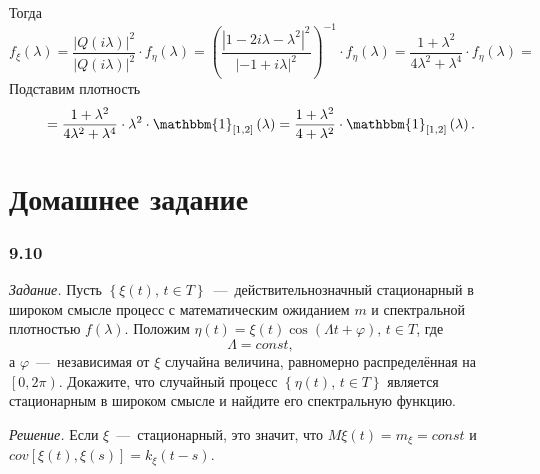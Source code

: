 Тогда
\begin{equation*}
  f_{ \xi } \left( \lambda \right) =
  \frac{ \left| Q \left( i \lambda \right) \right|^2}{ \left| Q \left( i \lambda \right) \right|^2} \cdot
  f_{ \eta } \left( \lambda \right) =
  \left( \frac{ \left| 1 - 2i \lambda - \lambda^2 \right|^2}{ \left| -1 + i \lambda \right|^2} \right)^{-1} \cdot
  f_{ \eta } \left( \lambda \right) =
  \frac{1 + \lambda^2}{4 \lambda^2 + \lambda^4} \cdot f_{ \eta } \left( \lambda \right) =
\end{equation*}
Подставим плотность
\begin{equation*}
  = \frac{1 + \lambda^2}{4 \lambda^2 + \lambda^4} \cdot \lambda^2 \cdot
  \mathbbm{1}_{ \left[ 1, 2 \right] } \left( \lambda \right) =
  \frac{1 + \lambda^2}{4 + \lambda^2} \cdot
  \mathbbm{1}_{ \left[ 1, 2 \right] } \left( \lambda \right).
\end{equation*}

\section*{Домашнее задание}

\subsubsection*{9.10}

\textit{Задание.}
Пусть $ \left\{ \xi \left( t \right), \, t \in T \right\} $~---~действительнозначный
стационарный в широком смысле процесс с математическим ожиданием $m$ и спектральной плотностью
$f \left( \lambda \right) $.
Положим
$ \eta \left( t \right) = \xi \left( t \right) \cos \left( \Lambda t + \varphi \right), \,
  t \in T$,
где
\begin{equation*}
  \Lambda =
  const,
\end{equation*}
а $\varphi$~---~независимая от $ \xi $ случайна величина,
равномерно распределённая на $ \left[ 0, 2 \pi \right) $.
Докажите, что случайный процесс $ \left\{ \eta \left( t \right), \, t \in T \right\} $
является стационарным в широком смысле и найдите его спектральную функцию.

\textit{Решение.}
Если $ \xi $~---~стационарный, это значит,
что $M \xi \left( t \right) = m_{ \xi } = const$ и
$cov \left[ \xi \left( t \right), \xi \left( s \right) \right] =
  k_{ \xi } \left( t - s \right) $.

